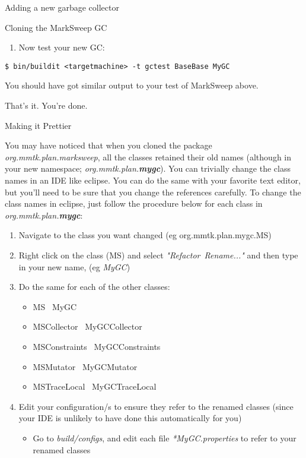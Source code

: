 \begin{section}{Adding a new garbage collector}
\begin{subsection}{Cloning the MarkSweep GC}
\begin{enumerate}
\begin{enumerate}
\begin{lstlisting}
config.mmtk.plan=org.mmtk.plan.marksweep.MS
\end{lstlisting}
to
\begin{lstlisting}
config.mmtk.plan=org.mmtk.plan.mygc.MS
\end{lstlisting}
      \end{enumerate}
    \item Now test your new GC:
\end{enumerate}
\begin{lstlisting}
$ bin/buildit <targetmachine> -t gctest BaseBase MyGC
\end{lstlisting}


You should have got similar output to your test of MarkSweep above.

That's it.  You're done. \smiley

\end{subsection}

\begin{subsection}{Making it Prettier}

You may have noticed that when you cloned the package \textit{org.mmtk.plan.marksweep}, all the classes retained their old names (although in your new namespace; \textit{org.mmtk.plan.\textbf{mygc}}).  You can trivially change the class names in an IDE like eclipse.  You can do the same with your favorite text editor, but you'll need to be sure that you change the references carefully.  To change the class names in eclipse, just follow the procedure below for each class in \textit{org.mmtk.plan.\textbf{mygc}}:
\begin{enumerate}
  \item Navigate to the class you want changed (eg  org.mmtk.plan.mygc.MS)
  \item Right click on the class (MS) and select \textit{"Refactor\textrightarrow\ Rename..."} and then type in your new name, (eg \textit{MyGC})
  \item Do the same for each of the other classes:
    \begin{itemize}
      \item MS \textrightarrow\  MyGC
      \item MSCollector \textrightarrow\  MyGCCollector
      \item MSConstraints \textrightarrow\  MyGCConstraints
      \item MSMutator \textrightarrow\  MyGCMutator
      \item MSTraceLocal \textrightarrow\  MyGCTraceLocal
    \end{itemize}
  \item Edit your configuration/s to ensure they refer to the renamed classes (since your IDE is unlikely to have done this automatically for you)
    \begin{itemize}
      \item Go to \textit{build/configs}, and edit each file \textit{*MyGC.properties} to refer to your renamed classes
    \end{itemize}
\end{enumerate}


\end{subsection}
\end{section}
